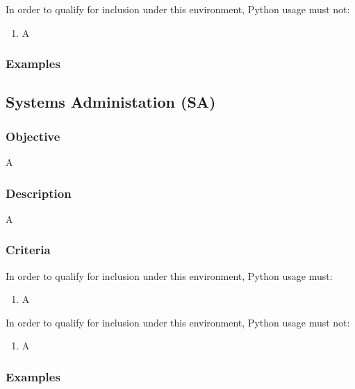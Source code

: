 			In order to qualify for inclusion under this environment, Python usage must not:

			\begin{enumerate}
        		\item A
        	\end{enumerate}

		\subsubsection{Examples}


	\subsection{Systems Administation (SA)}

		\subsubsection{Objective}

			A

		\subsubsection{Description}

			A

		\subsubsection{Criteria}

			In order to qualify for inclusion under this environment, Python usage must:

			\begin{enumerate}
        		\item A
        	\end{enumerate}

			In order to qualify for inclusion under this environment, Python usage must not:

			\begin{enumerate}
        		\item A
        	\end{enumerate}

		\subsubsection{Examples}

